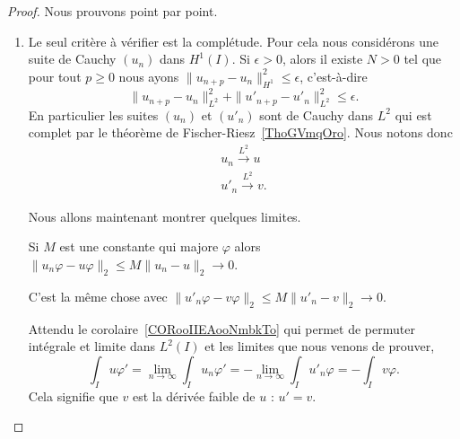 \begin{proof}
	Nous prouvons point par point.
	\begin{enumerate}
		\item
		      Le seul critère à vérifier est la complétude. Pour cela nous considérons une suite de Cauchy \( (u_n)\) dans \( H^1(I)\). Si \( \epsilon>0\), alors il existe \( N>0\) tel que pour tout \( p\geq 0\) nous ayons \( \| u_{n+p}-u_n \|_{H^1}^2\leq \epsilon\), c'est-à-dire
		      \begin{equation}
			      \| u_{n+p}-u_n \|^2_{L^2}+\| u'_{n+p}-u'_n \|^2_{L^2}\leq \epsilon.
		      \end{equation}
		      En particulier les suites \( (u_n)\) et \( (u'_n)\) sont de Cauchy dans \( L^2\) qui est complet par le théorème de Fischer-Riesz~\ref{ThoGVmqOro}. Nous notons donc
		      \begin{subequations}
			      \begin{align}
				      u_n\stackrel{L^2}{\to}u \\
				      u'_n\stackrel{L^2}{\to}v.
			      \end{align}
		      \end{subequations}

		      Nous allons maintenant montrer quelques limites.
		      \begin{subproof}
			      Si \( M\) est une constante qui majore \( \varphi\) alors \( \| u_n\varphi-u\varphi \|_2\leq M\| u_n-u \|_2\to 0\).

			      C'est la même chose avec \( \| u'_n\varphi-v\varphi \|_2\leq M\| u'_n-v \|_2\to 0\).

			      \spitem [\( u\in H^1(I)\) avec \( u'=v\)]
			      Attendu le corolaire~\ref{CORooIIEAooNmbkTo} qui permet de permuter intégrale et limite dans \( L^2(I)\) et les limites que nous venons de prouver,
			      \begin{equation}
				      \int_Iu\varphi'=\lim_{n\to \infty} \int_Iu_n\varphi'=-\lim_{n\to \infty} \int_Iu'_n\varphi=-\int_Iv\varphi.
			      \end{equation}
			      Cela signifie que \( v\) est la dérivée faible de \( u\) : \( u'=v\).


\end{subproof}
\end{enumerate}
\end{proof}
